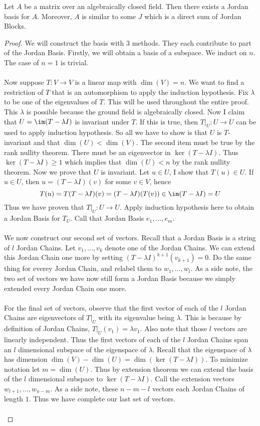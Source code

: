 \begin{thm}{}{} Let $A$ be a matrix over an algebraically closed field. Then there exists a Jordan basis for $A$. Moreover, $A$ is similar to some $J$ which is a direct sum of Jordan Blocks. \tcbline
\begin{proof} We will construct the basis with $3$ methods. They each contribute to part of the Jordan Basis. Firstly, we will obtain a basis of a subspace. We induct on $n$. The case of $n=1$ is trivial. \\~\\
Now suppose $T:V\to V$ is a linear map with $\dim(V)=n$. We want to find a restriction of $T$ that is an automorphism to apply the induction hypothesis. Fix $\lambda$ to be one of the eigenvalues of $T$. This will be used throughout the entire proof. This $\lambda$ is possible because the ground field is algebraically closed. Now I claim that $U=\im(T-\lambda I)$ is invariant under $T$. If this is true, then $T|_U:U\to U$ can be used to apply induction hypothesis. So all we have to show is that $U$ is $T$-invariant and that $\dim(U)<\dim(V)$. The second item must be true by the rank nullity theorem. There must be an eigenvector in $\ker(T-\lambda I)$. Thus $\ker(T-\lambda I)\geq 1$ which implies that $\dim(U)<n$ by the rank nullity theorem. Now we prove that $U$ is invariant. Let $u\in U$, I show that $T(u)\in U$. If $u\in U$, then $u=(T-\lambda I)(v)$ for some $v\in V$, hence $$T(u)=T(T-\lambda I)(v)=(T-\lambda I)(T(v))\in\im(T-\lambda I)=U$$ Thus we have proven that $T|_U:U\to U$. Apply induction hypothesis here to obtain a Jordan Basis for $T_U$. Call that Jordan Basis $e_1,\dots,e_m$. \\~\\
We now construct our second set of vectors. Recall that a Jordan Basis is a string of $l$ Jordan Chains. Let $v_1,\dots,v_k$ denote one of the Jordan Chains. We can extend this Jordan Chain one more by setting $(T-\lambda I)^{k+1}(v_{k+1})=0$. Do the same thing for everey Jordan Chain, and relabel them to $w_1,\dots,w_l$. As a side note, the two set of vectors we have now still form a Jordan Basis because we simply extended every Jordan Chain one more. \\~\\
For the final set of vectors, observe that the first vector of each of the $l$ Jordan Chains are eigenvectors of $T|_U$ with its eigenvalue being $\lambda$. This is because by definition of Jordan Chains, $T|_U(v_1)=\lambda v_1$. Also note that those $l$ vectors are linearly independent. Thus the first vectors of each of the $l$ Jordan Chains span an $l$ dimensional subspace of the eigenspace of $\lambda$. Recall that the eigenspace of $\lambda$ has dimension $\dim(V)-\dim(U)=\dim(\ker(T-\lambda I))$. To minimize notation let $m=\dim(U)$. Thus by extension theorem we can extend the basis of the $l$ dimensional subspace to $\ker(T-\lambda I)$. Call the extension vectors $w_{l+1},\dots,w_{n-m}$. As a side note, these $n-m-l$ vectors each Jordan Chains of length $1$. Thus we have complete our last set of vectors. \\~\\

\end{proof}
\end{thm}

